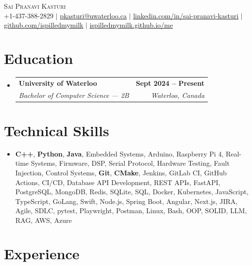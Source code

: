 \documentclass[letterpaper,10pt]{article}
\makeatletter
\newcommand{\resumeSubheading}[4]{
  \vspace{-1pt}\item
    \begin{tabular*}{1.0\textwidth}[t]{l@{\extracolsep{\fill}}r}
      \textbf{#1} & \textbf{\small #2} \\
      \textit{\small#3} & \textit{\small #4} \\[-2pt]
    \end{tabular*}\vspace{-7pt}
}
\newcommand{\resumeSubHeadingListStart}{\begin{itemize}[leftmargin=0.0in, label={}]}
\newcommand{\resumeSubHeadingListEnd}{\end{itemize}}
\makeatother
\begin{document}

\vspace{-28pt}
\begin{center}
    {\Huge \scshape Sai Pranavi Kasturi} \\
    \small +1-437-388-2829 $|$ \underline{pkasturi@uwaterloo.ca} $|$
    \href{https://linkedin.com/in/sai-pranavi-kasturi-704807298}{\underline{linkedin.com/in/sai-pranavi-kasturi}} $|$
    \href{https://github.com/ispilledmymilk}{\underline{github.com/ispilledmymilk}} $|$
    \href{https://ispilledmymilk.github.io/me/}{\underline{ispilledmymilk.github.io/me}}
    \vspace{-10pt}
\end{center}

\vspace{-10pt}
\section{Education}
  \resumeSubHeadingListStart
    \resumeSubheading
      {University of Waterloo}{Sept 2024 -- Present}
      {Bachelor of Computer Science --- 2B}{Waterloo, Canada}
  \resumeSubHeadingListEnd
\vspace{-8pt}

\section{Technical Skills}
\begin{itemize}[leftmargin=0.05in, label={}]
  \small\item{
    \textbf{C++}, \textbf{Python}, \textbf{Java}, Embedded Systems, Arduino, Raspberry Pi 4, Real-time Systems, Firmware, DSP, Serial Protocol, Hardware Testing, Fault Injection, Control Systems, \textbf{Git}, \textbf{CMake}, Jenkins, GitLab CI, GitHub Actions, CI/CD, Database API Development, REST APIs, FastAPI, PostgreSQL, MongoDB, Redis, SQLite, SQL, Docker, Kubernetes, JavaScript, TypeScript, GoLang, Swift, Node.js, Spring Boot, Angular, Next.js, JIRA, Agile, SDLC, pytest, Playwright, Postman, Linux, Bash, OOP, SOLID, LLM, RAG, AWS, Azure
  }
\end{itemize}
\vspace{-18pt}

\vspace{1.20pt}
\section{Experience}
\end{document}
